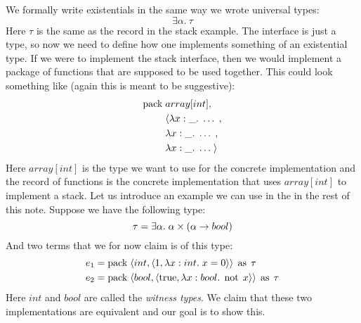 We formally write existentials in the same way we wrote universal types:
\[
  \exists \alpha. \: \tau
\]
Here $\tau$ is the same as the record in the stack example. The interface is just a type, so now we need to define how one implements something of an existential type. If we were to implement the stack interface, then we would implement a package of functions that are supposed to be used together. This could look something like (again this is meant to be suggestive):
\begin{align*}
  \operatorname{pack}\; &array[int], \\
         & \langle \lambda x:\_.\; \dots\;,\\
         & \lambda x:\_.\; \dots\;,\\
         & \lambda x:\_.\; \dots\; \rangle
\end{align*}
Here $array[int]$ is the type we want to use for the concrete implementation and the record of functions is the concrete implementation that uses $array[int]$ to implement a stack. Let us introduce an example we can use in the in the rest of this note. Suppose we have the following type:
\[
  \tau = \exists \alpha. \; \alpha \times ( \alpha \rightarrow bool)
\]
And two terms that we for now claim is of this type:
\begin{align*}
  e_1 & = \operatorname{pack} \; \langle int,\langle 1, \lambda x : int . \; x=0 \rangle \rangle \; \operatorname{as} \; \tau \\
  e_2 & = \operatorname{pack} \; \langle bool,\langle \text{true}, \lambda x : bool . \; \operatorname{not}\; x \rangle \rangle \; \operatorname{as} \; \tau
\end{align*}
Here $int$ and $bool$ are called the \emph{witness types}. We claim that these two implementations are equivalent and our goal is to show this. 

